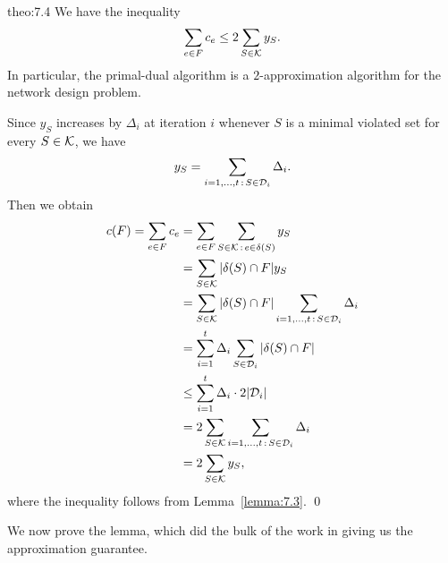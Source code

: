 \begin{theo}{theo:7.4}
    We have the inequality
    \[ \sum_{e \in F} c_e \leq 2 \sum_{S \in {\cal K}} y_S. \] 
    In particular, the primal-dual algorithm is a $2$-approximation algorithm 
    for the network design problem. 
\end{theo}\vspace{-0.25cm}
\begin{pf}
    Since $y_S$ increases by $\Delta_i$ at iteration $i$ whenever $S$ 
    is a minimal violated set for every $S \in {\cal K}$, we have 
    \[ y_S = \sum_{i=1,\dots, t\,:\,S \in {\cal D}_i} \Delta_i. \] 
    Then we obtain 
    \begin{align*}
        c(F) = \sum_{e \in F} c_e 
        &= \sum_{e \in F} \sum_{S \in {\cal K}\,:\,e\in\delta(S)} y_S \\
        &= \sum_{S \in {\cal K}} |\delta(S) \cap F| y_S \\ 
        &= \sum_{S \in {\cal K}} |\delta(S) \cap F| \sum_{i=1,\dots, t\,:\,S \in {\cal D}_i} \Delta_i \\ 
        &= \sum_{i=1}^t \Delta_i \sum_{S \in {\cal D}_i} |\delta(S) \cap F| \\ 
        &\leq \sum_{i=1}^t \Delta_i \cdot 2|{\cal D}_i| \\ 
        &= 2 \sum_{S \in {\cal K}} \sum_{i=1,\dots, t\,:\,S \in {\cal D}_i} \Delta_i \\ 
        &= 2 \sum_{S \in {\cal K}} y_S,
    \end{align*}
    where the inequality follows from Lemma~\ref{lemma:7.3}. \qed 
\end{pf}\vspace{-0.15cm}

We now prove the lemma, which did the bulk of the work in giving us the 
approximation guarantee. 

